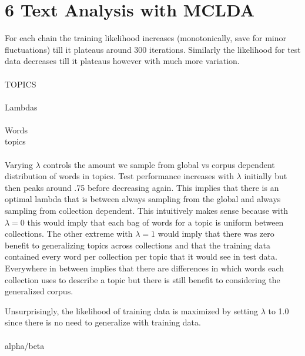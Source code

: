 \documentclass[12pt]{article}
\begin{document}
\section*{6 Text Analysis with MCLDA}
 For each chain the training likelihood increases (monotonically, save for minor fluctuations)  till it plateaus around 300 iterations. Similarly the likelihood for test data decreases till it plateaus however with much more variation. \\
\\
 TOPICS \\
\\
 Lambdas\\
\\
 Words \\
 topics \\
\\
 Varying $\lambda$ controls the amount we sample from global vs corpus dependent distribution of words in topics. Test performance increases with $\lambda$ initially but then peaks around .75 before decreasing again. This implies that there is an optimal lambda that is between always sampling from the global and always sampling from collection dependent. This intuitively makes sense because with $\lambda = 0$ this would imply that each bag of words for a topic is uniform between collections. The other extreme with $\lambda=1$ would imply that there was zero benefit to generalizing topics across collections and that the training data contained every word per collection per topic that it would see in test data. Everywhere in between implies that there are differences in which words each collection uses to describe a topic but there is still benefit to considering the generalized corpus.

Unsurprisingly, the likelihood of training data is maximized by setting $\lambda$ to 1.0 since there is no need to generalize with training data.
 \\
\\
 alpha/beta \\
\\
\end{document}
